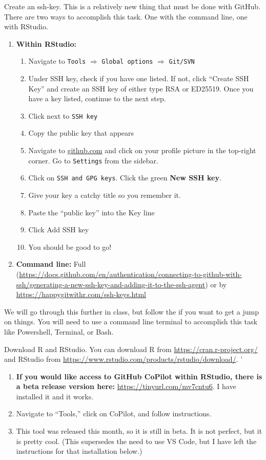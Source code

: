 \documentclass[12pt,english]{exam}
\begin{document}
\begin{questions}
\question Create an ssh-key. This is a relatively new thing that must be done with GitHub. There are two ways to accomplish this task. One with the command line, one with RStudio. 

\begin{enumerate}
  \item \textbf{Within RStudio:} 
  \begin{enumerate}
    \item Navigate to \texttt{Tools} $\Rightarrow$ \texttt{Global options} $\Rightarrow$ \texttt{Git/SVN}
    \item Under SSH key, check if you have one listed. If not, click ``Create SSH Key'' and create an SSH key of either type RSA or ED25519. Once you have a key listed, continue to the next step. 
    \item Click \color{blue}{View public key} \color{black} next to \texttt{SSH key}
    \item Copy the public key that appears
    \item Navigate to \url{github.com} and click on your profile picture in the top-right corner. Go to \texttt{Settings} from the sidebar. 
    \item Click on \texttt{SSH and GPG keys}. Click the green \textbf{New SSH key}. 
    \item Give your key a catchy title so you remember it. 
    \item Paste the ``public key'' into the Key line
    \item Click Add SSH key
    \item You should be good to go! 
  \end{enumerate}
  \item \textbf{Command line:} Full (\href{instructions here}{https://docs.github.com/en/authentication/connecting-to-github-with-ssh/generating-a-new-ssh-key-and-adding-it-to-the-ssh-agent}) or by \href{Jenny Bryan}{https://happygitwithr.com/ssh-keys.html}
\end{enumerate}

We will go through this further in class, but follow the  if you want to get a jump on things. You will need to use a command line terminal to accomplish this task like Powershell, Terminal, or Bash. 

\question Download R and RStudio. You can download R from \url{https://cran.r-project.org/} and RStudio from \url{https://www.rstudio.com/products/rstudio/download/}. '

\begin{enumerate}
  \item \textbf{If you would like access to GitHub CoPilot within RStudio, there is a beta release version here:} \url{https://tinyurl.com/mv7cntu6}. I have installed it and it works. 
  \item Navigate to ``Tools,'' click on CoPilot, and follow instructions. 
  \item This tool was released this month, so it is still in beta. It is not perfect, but it is pretty cool. (This supersedes the need to use VS Code, but I have left the instructions for that installation below.)
\end{enumerate}


\end{questions}
\end{document}
